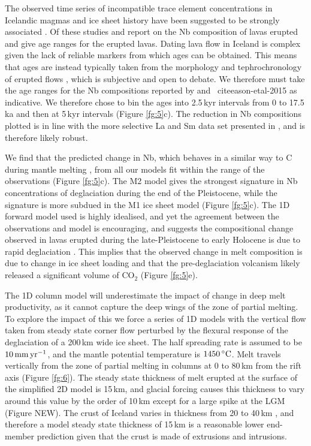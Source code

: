 \documentclass[draft,linenumbers]{agujournal2018}
\begin{document}
The observed time series of incompatible trace element concentrations in Icelandic magmas and ice sheet history have been suggested to be strongly associated \citep{jull-1996,gee-etal-1998,maclennan-etal-2002,sinton-etal-2005,eason-etal-2015}. Of these studies \cite{gee-etal-1998} and \cite{eason-etal-2015} report on the Nb composition of lavas erupted and give age ranges for the erupted lavas. Dating lava flow in Iceland is complex given the lack of reliable markers from which ages can be obtained. This means that ages are instead typically taken from the morphology and tephrochronology of erupted flows \citep{maclennan-etal-2002}, which is subjective and open to debate. We therefore must take the age ranges for the Nb compositions reported by \cite{gee-etal-1998} and \ cite{eason-etal-2015} as indicative. We therefore chose to bin the ages into 2.5\,kyr intervals from 0 to 17.5\,ka and then at 5\,kyr intervals (Figure \ref{fg:5}c). The reduction in Nb compositions plotted is in line with the more selective La and Sm data set presented in \cite{maclennan-etal-2002}, and is therefore likely robust.

We find that the predicted change in Nb, which behaves in a similar way to C during mantle melting \citep{rosenthal-etal-2015}, from all our models fit within the range of the observations (Figure \ref{fg:5}c). The M2 model gives the strongest signature in Nb concentrations of deglaciation during the end of the Pleistocene, while the signature is more subdued in the M1 ice sheet model (Figure \ref{fg:5}c). The 1D forward model used is highly idealised, and yet the agreement between the observations and model is encouraging, and suggests the compositional change observed in lavas erupted during the late-Pleistocene to early Holocene is due to rapid deglaciation \citep{maclennan-etal-2002,sinton-etal-2005,gee-etal-1998,eason-etal-2015}. This implies that the observed change in melt composition is due to change in ice sheet loading and that the pre-deglaciation volcanism likely released a significant volume of CO$_{2}$ (Figure \ref{fg:5}e).

The 1D column model will underestimate the impact of change in deep melt productivity, as it cannot capture the deep wings of the zone of partial melting. To explore the impact of this we force a series of 1D models with the vertical flow taken from steady state corner flow perturbed by the flexural response of the deglaciation of a 200\,km wide ice sheet. The half spreading rate is assumed to be $10\rm\,mm\,yr^{-1}$, and the mantle potential temperature is $1450\rm\,^{\circ}C$. Melt travels vertically from the zone of partial melting in columns at 0 to 80\,km from the rift axis (Figure \ref{fg:6}). The steady state thickness of melt erupted at the surface of the simplified 2D model is 15\,km, and glacial forcing causes this thickness to vary around this value by the order of 10\,km except for a large spike at the LGM (Figure NEW). The crust of Iceland varies in thickness from 20 to 40\,km \citep{jenkins-etal-2017}, and therefore a model steady state thickness of 15\,km is a reasonable lower end-member prediction given that the crust is made of extrusions and intrusions.
\end{document}
